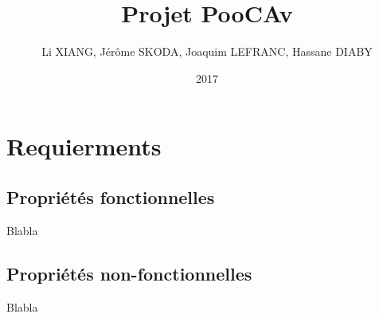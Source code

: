 \documentclass[12pt]{article}
\title{Projet PooCAv}
\author{Li XIANG, Jérôme SKODA, Joaquim LEFRANC, Hassane DIABY}
\date{2017}
\begin{document}
\maketitle
\section{Requierments}

\subsection{Propriétés fonctionnelles}
Blabla

\subsection{Propriétés non-fonctionnelles}
Blabla
\end{document}
